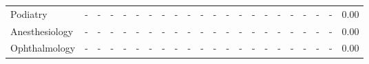 \begin{landscape}
\begin{table}[H]
\begin{tabular}{l||ccccccccccc||cc||ccccc||cc||c}
Podiatry               &         - &              - &                 - &                 - &                 - &                 - &                 - &                 - &                 - &                 - &                 - &              - &                 - &              - &                 - &                 - &                 - &                 - &                 - &           - &    0.00 \\
Anesthesiology         &         - &              - &                 - &                 - &                 - &                 - &                 - &                 - &                 - &                 - &                 - &              - &                 - &              - &                 - &                 - &                 - &                 - &                 - &           - &    0.00 \\
Ophthalmology          &         - &              - &                 - &                 - &                 - &                 - &                 - &                 - &                 - &                 - &                 - &              - &                 - &              - &                 - &                 - &                 - &                 - &                 - &           - &    0.00 \\
\bottomrule
\end{tabular}
\end{table}

\end{landscape}
\restoregeometry